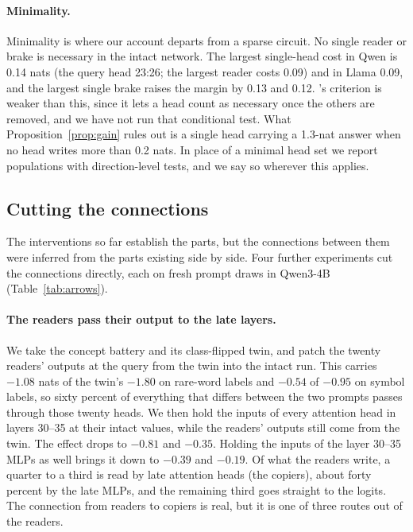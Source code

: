 \documentclass{article}
\begin{document}
\paragraph{Minimality.} Minimality is where our account departs from a sparse circuit. No single reader or brake is necessary in the intact network. The largest single-head cost in Qwen is 0.14 nats (the query head 23:26; the largest reader costs 0.09) and in Llama 0.09, and the largest single brake raises the margin by 0.13 and 0.12. \citet{wang2022ioi}'s criterion is weaker than this, since it lets a head count as necessary once the others are removed, and we have not run that conditional test. What Proposition~\ref{prop:gain} rules out is a single head carrying a 1.3-nat answer when no head writes more than 0.2 nats. In place of a minimal head set we report populations with direction-level tests, and we say so wherever this applies.

\subsection{Cutting the connections}\label{sec:arrows}
The interventions so far establish the parts, but the connections between them were inferred from the parts existing side by side. Four further experiments cut the connections directly, each on fresh prompt draws in Qwen3-4B (Table~\ref{tab:arrows}).

\paragraph{The readers pass their output to the late layers.} We take the concept battery and its class-flipped twin, and patch the twenty readers' outputs at the query from the twin into the intact run. This carries $-1.08$ nats of the twin's $-1.80$ on rare-word labels and $-0.54$ of $-0.95$ on symbol labels, so sixty percent of everything that differs between the two prompts passes through those twenty heads. We then hold the inputs of every attention head in layers 30--35 at their intact values, while the readers' outputs still come from the twin. The effect drops to $-0.81$ and $-0.35$. Holding the inputs of the layer 30--35 MLPs as well brings it down to $-0.39$ and $-0.19$. Of what the readers write, a quarter to a third is read by late attention heads (the copiers), about forty percent by the late MLPs, and the remaining third goes straight to the logits. The connection from readers to copiers is real, but it is one of three routes out of the readers.
\end{document}
